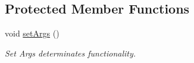 \subsection*{Protected Member Functions}
\begin{DoxyCompactItemize}
\item 
\hypertarget{classhandler__Report_a1406730673c2d437877e0f76ed5901f4}{
void \hyperlink{classhandler__Report_a1406730673c2d437877e0f76ed5901f4}{setArgs} ()}
\label{classhandler__Report_a1406730673c2d437877e0f76ed5901f4}

\begin{DoxyCompactList}\small\item\em Set Args determinates functionality. \item\end{DoxyCompactList}\end{DoxyCompactItemize}
